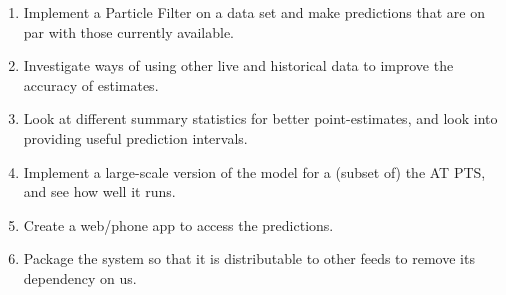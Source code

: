\documentclass[12pt,a4paper]{article}
\begin{document}














\begin{enumerate}
\item 
  Implement a Particle Filter on a data set and make predictions that are on par with those currently available.

\item 
  Investigate ways of using other live and historical data to improve the accuracy of estimates.

\item 
  Look at different summary statistics for better point-estimates, and look into providing useful prediction intervals.

\item 
  Implement a large-scale version of the model for a (subset of) the AT PTS, and see how well it runs.

\item 
  Create a web/phone app to access the predictions.

\item
  Package the system so that it is distributable to other feeds to remove its dependency on us.
\end{enumerate}
\end{document}

